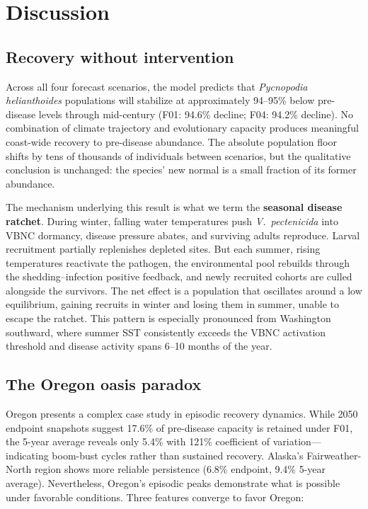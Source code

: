 
\section{Discussion}
\label{sec:discussion}

\subsection{Recovery without intervention}

Across all four forecast scenarios, the model predicts that
\textit{Pycnopodia helianthoides} populations will stabilize at
approximately 94--95\% below pre-disease levels through mid-century
(F01: 94.6\% decline; F04: 94.2\% decline).  No combination of climate
trajectory and evolutionary capacity produces meaningful coast-wide
recovery to pre-disease abundance.  The absolute population floor shifts
by tens of thousands of individuals between scenarios, but the
qualitative conclusion is unchanged: the species' new normal is a
small fraction of its former abundance.

The mechanism underlying this result is what we term the
\textbf{seasonal disease ratchet}.  During winter, falling water
temperatures push \textit{V.\ pectenicida} into VBNC dormancy,
disease pressure abates, and surviving adults reproduce.  Larval
recruitment partially replenishes depleted sites.  But each summer,
rising temperatures reactivate the pathogen, the environmental pool
rebuilds through the shedding--infection positive feedback, and newly
recruited cohorts are culled alongside the survivors.  The net effect
is a population that oscillates around a low equilibrium, gaining
recruits in winter and losing them in summer, unable to escape the
ratchet.  This pattern is especially pronounced from Washington
southward, where summer SST consistently exceeds the VBNC activation
threshold and disease activity spans 6--10 months of the year.

\subsection{The Oregon oasis paradox}

Oregon presents a complex case study in episodic recovery dynamics. 
While 2050 endpoint snapshots suggest 17.6\% of pre-disease capacity 
is retained under F01, the 5-year average reveals only 5.4\% with 121\% 
coefficient of variation---indicating boom-bust cycles rather than 
sustained recovery. Alaska's Fairweather-North region shows more 
reliable persistence (6.8\% endpoint, 9.4\% 5-year average). 
Nevertheless, Oregon's episodic peaks demonstrate what is possible 
under favorable conditions.  Three
features converge to favor Oregon:

